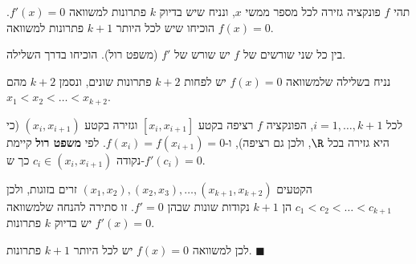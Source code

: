 
\begin{question}
תהי $f$ פונקציה גזירה לכל מספר ממשי $x$, ונניח שיש בדיוק $k$ פתרונות למשוואה $f'(x)=0$. הוכיחו שיש לכל היותר $k+1$ פתרונות למשוואה $f(x)=0$.
\end{question}

\begin{hint}
בין כל שני שורשים של $f$ יש שורש של $f'$ (משפט רול). הוכיחו בדרך השלילה.
\end{hint}

\begin{solution}
נניח בשלילה שלמשוואה $f(x)=0$ יש לפחות $k+2$ פתרונות שונים, ונסמן $k+2$ מהם $x_1<x_2<\dots<x_{k+2}$.

לכל $i=1,\dots,k+1$, הפונקציה $f$ רציפה בקטע $[x_i,x_{i+1}]$ וגזירה בקטע $(x_i,x_{i+1})$ (כי היא גזירה בכל $\R$, ולכן גם רציפה), ו-$f(x_i)=f(x_{i+1})=0$. לפי \textbf{משפט רול} קיימת נקודה $c_i\in(x_i,x_{i+1})$ כך ש-$f'(c_i)=0$.

הקטעים $(x_1,x_2),(x_2,x_3),\dots,(x_{k+1},x_{k+2})$ זרים בזוגות, ולכן $c_1<c_2<\dots<c_{k+1}$ הן $k+1$ נקודות שונות שבהן $f'=0$. זו סתירה להנחה שלמשוואה $f'(x)=0$ יש בדיוק $k$ פתרונות.

לכן למשוואה $f(x)=0$ יש לכל היותר $k+1$ פתרונות. $\blacksquare$
\end{solution}
